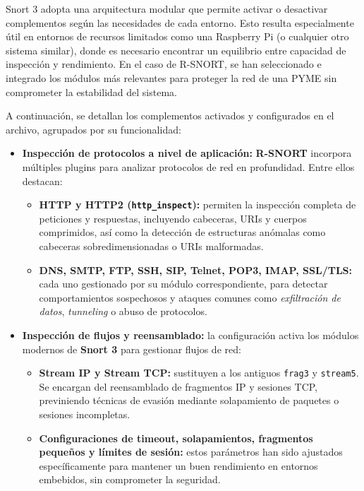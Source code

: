 \documentclass[11pt,a4paper,twoside]{report}
\begin{document}
Snort 3 adopta una arquitectura modular que permite activar o desactivar complementos según las necesidades de cada entorno. Esto resulta especialmente útil en entornos de recursos limitados como una Raspberry Pi (o cualquier otro sistema similar), donde es necesario encontrar un equilibrio entre capacidad de inspección y rendimiento. En el caso de R-SNORT, se han seleccionado e integrado los módulos más relevantes para proteger la red de una PYME sin comprometer la estabilidad del sistema.\newline

A continuación, se detallan los complementos activados y configurados en el archivo, agrupados por su funcionalidad:

\begin{itemize}
	\item \textbf{Inspección de protocolos a nivel de aplicación:}  
	\textbf{R-SNORT} incorpora múltiples plugins para analizar protocolos de red en profundidad. Entre ellos destacan:
	\begin{itemize}
		\item \textbf{HTTP y HTTP2 (\texttt{http\_inspect}):} permiten la inspección completa de peticiones y respuestas, incluyendo cabeceras, URIs y cuerpos comprimidos, así como la detección de estructuras anómalas como cabeceras sobredimensionadas o URIs malformadas.
		\item \textbf{DNS, SMTP, FTP, SSH, SIP, Telnet, POP3, IMAP, SSL/TLS:} cada uno gestionado por su módulo correspondiente, para detectar comportamientos sospechosos y ataques comunes como \textit{exfiltración de datos}, \textit{tunneling} o abuso de protocolos.
	\end{itemize}
	
	\item \textbf{Inspección de flujos y reensamblado:}  
	la configuración activa los módulos modernos de \textbf{Snort 3} para gestionar flujos de red:
	\begin{itemize}
		\item \textbf{Stream IP y Stream TCP:} sustituyen a los antiguos \texttt{frag3} y \texttt{stream5}. Se encargan del reensamblado de fragmentos IP y sesiones TCP, previniendo técnicas de evasión mediante solapamiento de paquetes o sesiones incompletas.
		\item \textbf{Configuraciones de timeout, solapamientos, fragmentos pequeños y límites de sesión:} estos parámetros han sido ajustados específicamente para mantener un buen rendimiento en entornos embebidos, sin comprometer la seguridad.
	\end{itemize}
	

\end{itemize}
\end{document}
